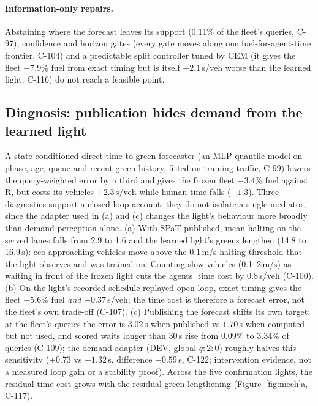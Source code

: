 \documentclass[11pt]{article}
\begin{document}
\paragraph{Information-only repairs.} Abstaining where the forecast leaves its support (0.11\% of the fleet's queries, C-97), confidence and
horizon gates (every gate moves along one fuel-for-agent-time frontier, C-104) and a predictable split controller tuned by CEM (it gives the
fleet $-7.9\%$ fuel from exact timing but is itself $+2.1$\,s/veh worse than the learned light, C-116) do not reach a feasible point.

\subsection{Diagnosis: publication hides demand from the learned light}
A state-conditioned direct time-to-green forecaster (an MLP quantile model on phase, age, queue and recent green history, fitted on training
traffic, C-99) lowers the query-weighted error by a third and gives the frozen fleet $-3.4\%$ fuel against R, but costs its vehicles
$+2.3$\,s/veh while human time falls ($-1.3$). Three diagnostics support a closed-loop account; they do not isolate a single mediator,
since the adapter used in (a) and (c) changes the light's behaviour more broadly than demand perception alone.
(a) With SPaT published, mean halting on the served lanes falls from 2.9 to 1.6 and the learned light's greens lengthen (14.8 to 16.9\,s):
eco-approaching vehicles move above the $0.1$\,m/s halting threshold that the light observes and was trained on. Counting slow vehicles
(0.1--2\,m/s) as waiting in front of the frozen light cuts the agents' time cost by $0.8$\,s/veh (C-100).
(b) On the light's recorded schedule replayed open loop, exact timing gives the fleet $-5.6\%$ fuel \emph{and} $-0.37$\,s/veh; the time
cost is therefore a forecast error, not the fleet's own trade-off (C-107).
(c) Publishing the forecast shifts its own target: at the fleet's queries the error is $3.02$\,s when published vs $1.70$\,s when computed
but not used, and scored waits longer than 30\,s rise from $0.09\%$ to $3.34\%$ of queries (C-109); the demand adapter (DEV, global $q{:}2{:}0$) roughly halves this
sensitivity ($+0.73$ vs $+1.32$\,s, difference $-0.59$\,s, C-122; intervention evidence, not a measured loop gain or a stability proof). Across the five confirmation lights, the residual time cost grows with the residual green lengthening
(Figure~\ref{fig:mech}a, C-117).
\end{document}
